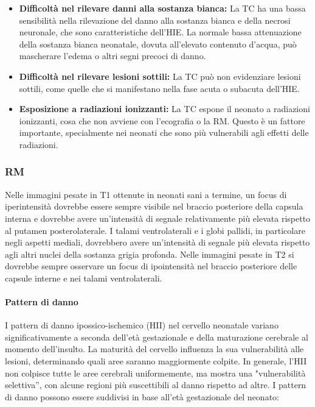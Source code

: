 \begin{itemize}
	\tightlist
	\item
	\textbf{Difficoltà nel rilevare danni alla sostanza bianca:} La TC ha una bassa sensibilità nella rilevazione del danno alla sostanza bianca e della necrosi neuronale, che sono caratteristiche dell'HIE. La normale bassa attenuazione della sostanza bianca neonatale, dovuta all'elevato contenuto d'acqua, può mascherare l'edema o altri segni precoci di danno.
	\item
	\textbf{Difficoltà nel rilevare lesioni sottili:} La TC può non evidenziare lesioni sottili, come quelle che si manifestano nella fase acuta o subacuta dell'HIE.
	\item
	\textbf{Esposizione a radiazioni ionizzanti:} La TC espone il neonato a radiazioni ionizzanti, cosa che non avviene con l'ecografia o la RM. Questo è un fattore importante, specialmente nei neonati che sono più vulnerabili agli effetti delle radiazioni.
\end{itemize}

\subsubsection{RM}
Nelle immagini pesate in T1 ottenute in neonati sani a termine, un focus di iperintensità dovrebbe essere sempre visibile nel braccio posteriore della capsula interna e dovrebbe avere un'intensità di segnale relativamente più elevata rispetto al putamen posterolaterale. I talami ventrolaterali e i globi pallidi, in particolare negli aspetti mediali, dovrebbero avere un'intensità di segnale più elevata rispetto agli altri nuclei della sostanza grigia profonda. Nelle immagini pesate in T2  si dovrebbe sempre osservare un focus di ipointensità nel braccio posteriore delle capsule interne e nei talami ventrolaterali.

\paragraph{Pattern di danno} I pattern di danno ipossico-ischemico (HII) nel cervello neonatale variano significativamente a seconda dell'età gestazionale e della maturazione cerebrale al momento dell'insulto. La maturità del cervello influenza la sua vulnerabilità alle lesioni, determinando quali aree saranno maggiormente colpite. In generale, l'HII non colpisce tutte le aree cerebrali uniformemente, ma mostra una "vulnerabilità selettiva'', con alcune regioni più suscettibili al danno rispetto ad altre. I pattern di danno possono essere suddivisi in base all'età gestazionale del neonato:

